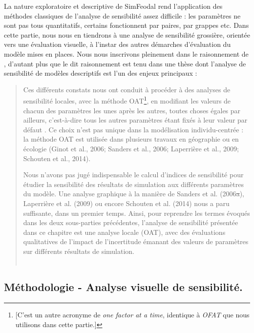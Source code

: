 La nature exploratoire et descriptive de SimFeodal rend l'application des méthodes classiques de l'analyse de sensibilité assez difficile : les paramètres ne sont pas tous quantitatifs, certains fonctionnent par paires, par grappes etc.
Dans cette partie, nous nous en tiendrons à une analyse de sensibilité grossière, orientée vers une évaluation visuelle, à l'instar des autres démarches d'évaluation du modèle mises en places.
Nous nous inscrivons pleinement dans le raisonnement de , d'autant plus que le dit raisonnement est tenu dans une thèse dont l'analyse de sensibilité de modèles descriptifs est l'un des enjeux principaux :
\begin{quotation}
	\og Ces différents constats nous ont conduit à procéder à des analyses de sensibilité locales, avec la méthode OAT\footnote{
		[C'est un autre acronyme de \og \textit{one factor at a time}\fg{}, identique à \textit{OFAT} que nous utilisons dans cette partie.]
	}, en modifiant les valeurs de chacun des paramètres les unes après les autres, toutes choses égales par ailleurs, c’est-à-dire tous les autres paramètres étant fixés à leur valeur par défaut \textelp{}.
	Ce choix n’est pas unique dans la modélisation individu-centrée : la méthode OAT est utilisée dans plusieurs travaux en géographie ou en écologie (Ginot et al., 2006; Sanders et al., 2006; Laperrière et al., 2009; Schouten et al., 2014).
	
	Nous n’avons pas jugé indispensable le calcul d’indices de sensibilité pour étudier la sensibilité des résultats de simulation aux différents paramètres du modèle.
	Une analyse graphique à la manière de Sanders et al. (2006\st{a}), Laperrière et al. (2009) ou encore Schouten et al. (2014) nous a paru suffisante, dans un premier temps.
	Ainsi, pour reprendre les termes évoqués dans les deux sous-parties précédentes, l’analyse de sensibilité présentée dans ce chapitre est une analyse locale (OAT), avec des évaluations qualitatives de l’impact de l’incertitude émanant des valeurs de paramètres sur différents résultats de simulation.\fg{}\\
	\mbox{}~ \hfill \cite[251-252]{hirtzel2015exploration}
\end{quotation}


\subsection{Méthodologie - Analyse visuelle de sensibilité.}

